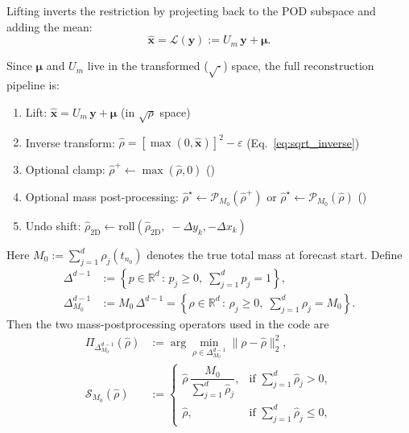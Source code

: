 \documentclass{report}
\theoremstyle{plain}
\theoremstyle{remark}
\numberwithin{equation}{section}              %
\begin{document}
Lifting inverts the restriction by projecting back to the POD subspace and
adding the mean:
\begin{equation}
  \hat{\mathbf{x}} = \mathcal{L}(\mathbf{y})
  := U_m\,\mathbf{y} + \boldsymbol{\mu}.
  \label{eq:lifting}
\end{equation}
{\setlength{\abovedisplayskip}{5pt}
\setlength{\belowdisplayskip}{5pt}
\setlength{\abovedisplayshortskip}{4pt}
\setlength{\belowdisplayshortskip}{4pt}
\setlength{\jot}{3pt}
Since $\boldsymbol{\mu}$ and $U_m$ live in the transformed
($\sqrt{\cdot}$) space, the full reconstruction pipeline is:
\begin{enumerate}[leftmargin=*, itemsep=1pt, topsep=3pt, parsep=0pt, partopsep=0pt]
  \item Lift: $\hat{\mathbf{x}} = U_m\,\mathbf{y}+\boldsymbol{\mu}$
        \hfill(in $\sqrt{\rho}$ space)
  \item Inverse transform:
        $\hat\rho = [\max(0,\hat{\mathbf{x}})]^2 - \varepsilon$
        \hfill(Eq.~\ref{eq:sqrt_inverse})
  \item Optional clamp:
        $\hat\rho^{+} \leftarrow \max(\hat\rho,0)$
        \hfill()
  \item Optional mass post-processing:
        $\hat\rho^\star \leftarrow \mathcal{P}_{M_0}(\hat\rho^{+})$
        or $\hat\rho^\star \leftarrow \mathcal{P}_{M_0}(\hat\rho)$
        \hfill()
  \item Undo shift: $\hat\rho_{2\mathrm{D}}
        \leftarrow \mathrm{roll}(\hat\rho_{2\mathrm{D}},\;
        -\Delta y_k,-\Delta x_k)$
\end{enumerate}
Here \(M_0 := \sum_{j=1}^{d}\rho_j(t_{n_0})\) denotes the true total mass at
forecast start. Define
\begin{align}
  \Delta^{d-1}
  &:= \left\{
    p\in\mathbb{R}^{d} \,:\,
    p_j\ge 0,\;
    \sum_{j=1}^{d} p_j = 1
  \right\},
  \label{eq:probability_simplex}\\
  \Delta^{d-1}_{M_0}
  &:= M_0\,\Delta^{d-1}
  =
  \left\{
    \rho\in\mathbb{R}^{d} \,:\,
    \rho_j\ge 0,\;
    \sum_{j=1}^{d} \rho_j = M_0
  \right\}.
  \label{eq:mass_simplex}
\end{align}
Then the two mass-postprocessing operators used in the code are
\begin{align}
  \Pi_{\Delta^{d-1}_{M_0}}(\hat\rho)
  &:= \arg\min_{\rho\in\Delta^{d-1}_{M_0}}
  \|\rho-\hat\rho\|_2^2,
  \label{eq:mass_postprocess_simplex}\\
  \mathcal{S}_{M_0}(\hat\rho)
  &:=
  \begin{cases}
    \hat\rho\,\dfrac{M_0}{\sum_{j=1}^{d}\hat\rho_j},
    & \text{if }\sum_{j=1}^{d}\hat\rho_j > 0,\\[6pt]
    \hat\rho,
    & \text{if }\sum_{j=1}^{d}\hat\rho_j \le 0,
  \end{cases}
  \label{eq:mass_postprocess_scale}
\end{align}
}
\end{document}
